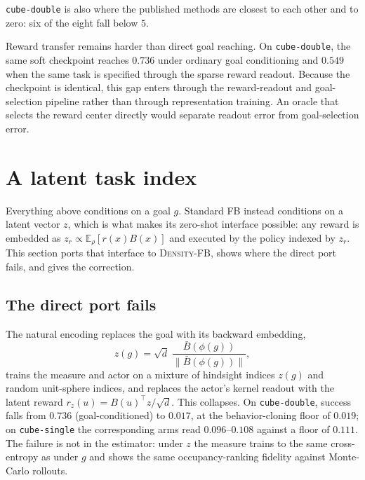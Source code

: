 \documentclass{article}
\newcommand{\E}{\mathbb{E}}
\newcommand{\DensityFB}{\textsc{Density-FB}}
\begin{document}
\texttt{cube-double} is also where the published methods are closest to each other and to zero: six of the eight fall below $5$.

Reward transfer remains harder than direct goal reaching.
On \texttt{cube-double}, the same soft checkpoint reaches $0.736$ under ordinary goal conditioning and $0.549$ when the same task is specified through the sparse reward readout.
Because the checkpoint is identical, this gap enters through the reward-readout and goal-selection pipeline rather than through representation training.
An oracle that selects the reward center directly would separate readout error from goal-selection error.

\section{A latent task index}
\label{sec:latent}

Everything above conditions on a goal $g$.
Standard FB instead conditions on a latent vector $z$, which is what makes its zero-shot interface possible: any reward is embedded as $z_r \propto \E_\rho[r(x)B(x)]$ and executed by the policy indexed by $z_r$.
This section ports that interface to \DensityFB{}, shows where the direct port fails, and gives the correction.

\subsection{The direct port fails}
\label{sec:latent-fails}

The natural encoding replaces the goal with its backward embedding,
\begin{equation}
\label{eq:zenc}
z(g) = \sqrt d\;\frac{\bar B(\phi(g))}{\|\bar B(\phi(g))\|},
\end{equation}
trains the measure and actor on a mixture of hindsight indices $z(g)$ and random unit-sphere indices, and replaces the actor's kernel readout with the latent reward $r_z(u)=B(u)^\top z/\sqrt d$.
This collapses.
On \texttt{cube-double}, success falls from $0.736$ (goal-conditioned) to $0.017$, at the behavior-cloning floor of $0.019$; on \texttt{cube-single} the corresponding arms read $0.096$--$0.108$ against a floor of $0.111$.
The failure is not in the estimator: under $z$ the measure trains to the same cross-entropy as under $g$ and shows the same occupancy-ranking fidelity against Monte-Carlo rollouts.
\end{document}
